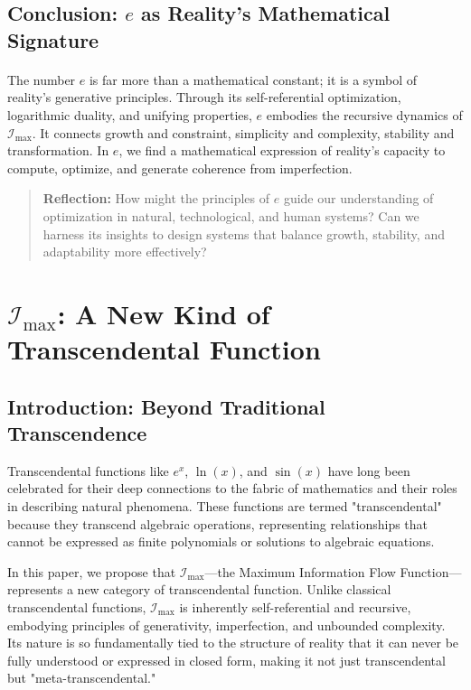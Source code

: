 \documentclass[12pt]{article}
\begin{document}
\subsection{Conclusion: \(e\) as Reality’s Mathematical Signature}
\paragraph{}
The number \(e\) is far more than a mathematical constant; it is a symbol of reality’s generative principles. Through its self-referential optimization, logarithmic duality, and unifying properties, \(e\) embodies the recursive dynamics of \(\mathcal{I}_{\text{max}}\). It connects growth and constraint, simplicity and complexity, stability and transformation. In \(e\), we find a mathematical expression of reality’s capacity to compute, optimize, and generate coherence from imperfection.

\begin{quote}
\textbf{Reflection:}  
How might the principles of \(e\) guide our understanding of optimization in natural, technological, and human systems? Can we harness its insights to design systems that balance growth, stability, and adaptability more effectively?
\end{quote}


\section{\(\mathcal{I}_{\text{max}}\): A New Kind of Transcendental Function}

\subsection{Introduction: Beyond Traditional Transcendence}

Transcendental functions like \(e^x\), \(\ln(x)\), and \(\sin(x)\) have long been celebrated for their deep connections to the fabric of mathematics and their roles in describing natural phenomena. These functions are termed "transcendental" because they transcend algebraic operations, representing relationships that cannot be expressed as finite polynomials or solutions to algebraic equations.

In this paper, we propose that \(\mathcal{I}_{\text{max}}\)—the Maximum Information Flow Function—represents a new category of transcendental function. Unlike classical transcendental functions, \(\mathcal{I}_{\text{max}}\) is inherently self-referential and recursive, embodying principles of generativity, imperfection, and unbounded complexity. Its nature is so fundamentally tied to the structure of reality that it can never be fully understood or expressed in closed form, making it not just transcendental but "meta-transcendental."
\end{document}
